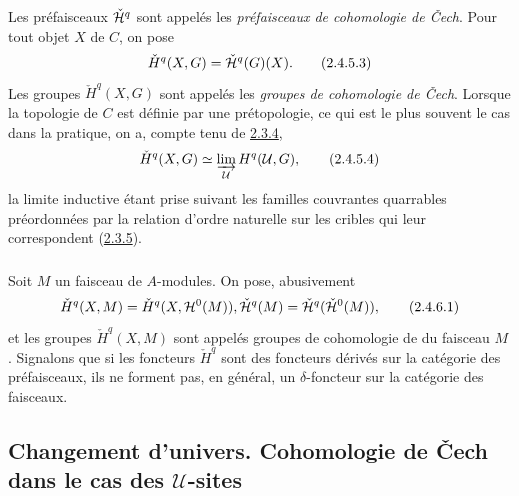 \documentclass[10pt]{../fichiers-configuration-latex/smfart}
\begin{document}
Les \pageoriginale préfaisceaux $\check{{\mathcal H}}^{q}$ sont appelés les
\emph{préfaisceaux de cohomologie de Čech}. Pour tout objet
  $X$ de $C$, on pose
\begin{equation*}
{\check{H}}^q (X, G) = \check{{\mathcal H}}^{q} (G) (X){}.\tag{2.4.5.3}
\end{equation*}
Les groupes ${\check{H}}^q(X, G)$ sont appelés les \emph{groupes de
  cohomologie de Čech}. Lorsque la topologie de $C$ est
  définie par une prétopologie, ce qui est le plus souvent le cas
  dans la pratique, on a, compte tenu de \hyperref[V.prop2.3.4]{2.3.4},
\begin{equation*}
{\check{H}}^q (X, G) \simeq \varinjlim_{\mathcal{U}} {H}^{q}
(\mathcal{U}, G){},\tag{2.4.5.4}
\end{equation*}
la limite inductive étant prise suivant les familles couvrantes
quarrables préordonnées par la relation d'ordre naturelle sur les
cribles qui leur correspondent (\hyperref[V.cor2.3.5]{2.3.5}).

\subsubsection{}
Soit $M$ un faisceau de $A$-modules. On pose, abusivement
\begin{equation}
{\check{H}}^q (X, M) = {\check{H}}^q (X, {\mathcal H}^{0}(M)),
\check{{\mathcal H}}^{q} (M) = \check{{\mathcal H}}^{q}(\check{{\mathcal H}}^{0} (M)){},\tag{2.4.6.1}
\end{equation}
et les groupes ${\check{H}}^q(X, M)$ sont appelés groupes de
cohomologie de  du faisceau $M$. Signalons que si les
foncteurs ${\check{H}}^q$ sont des foncteurs dérivés sur la
catégorie des préfaisceaux, ils ne forment pas, en général, un
$\delta$-foncteur sur la catégorie des faisceaux.

\subsection{Changement d'univers. Cohomologie de Čech dans le cas des $𝒰$-sites}
\end{document}
